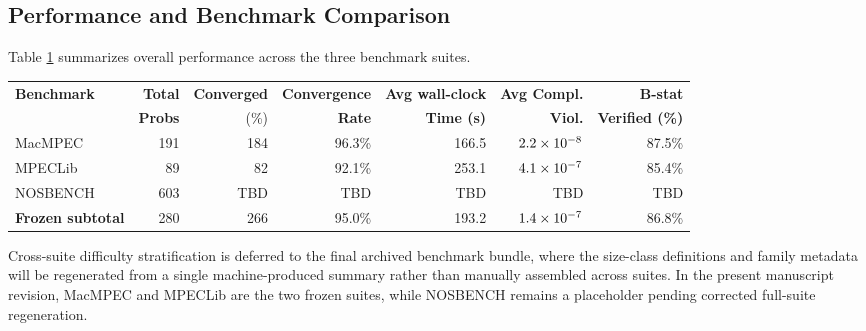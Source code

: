 \subsection{Performance and Benchmark Comparison}
\label{sec:aggregate_stats}

Table \ref{tab:aggregate_results} summarizes overall performance across the three benchmark suites.

\begin{table}[htb]
{\begin{tabular}{l r r r r r r}
\toprule
\textbf{Benchmark} & \textbf{Total} & \textbf{Converged} & \textbf{Convergence} & \textbf{Avg wall-clock} &
\textbf{Avg Compl.} & \textbf{B-stat} \\
 & \textbf{Probs} & (\%) & \textbf{Rate} & \textbf{Time (s)} & \textbf{Viol.} & \textbf{Verified (\%)} \\
\midrule
MacMPEC & 191 & 184 & 96.3\% & 166.5 & $2.2\times 10^{-8}$ & 87.5\% \\
MPECLib & 89 & 82 & 92.1\% & 253.1 & $4.1\times 10^{-7}$ & 85.4\% \\
NOSBENCH & 603 & TBD & TBD & TBD & TBD & TBD \\
\midrule
\textbf{Frozen subtotal} & 280 & 266 & 95.0\% & 193.2 & $1.4\times 10^{-7}$ & 86.8\% \\
\bottomrule
\end{tabular}}
\label{tab:aggregate_results}
\end{table}

Cross-suite difficulty stratification is deferred to the final archived
benchmark bundle, where the size-class definitions and family metadata
will be regenerated from a single machine-produced summary rather than
manually assembled across suites.  In the present manuscript revision,
MacMPEC and MPECLib are the two frozen suites, while NOSBENCH remains a
placeholder pending corrected full-suite regeneration.
